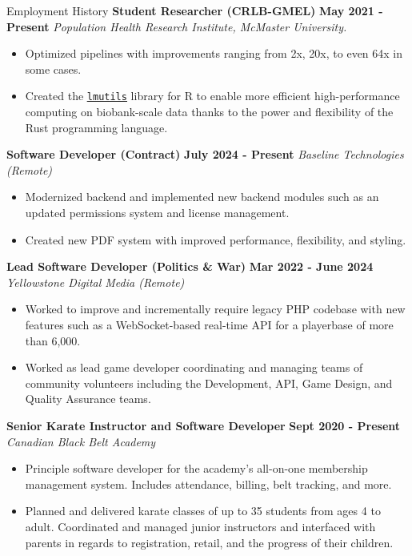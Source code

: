 \newcommand{\employer}[5]{%
	\entry*
	\textbf{#1} \hfill \textbf{#2 - #3}
	\newline
	\textit{#4}
	\begin{itemize}
		\setlength\parskip{-4pt}
		\vspace{-5pt}
		#5
	\end{itemize}
}

\newcommand{\link}[1]{\textcolor{MarkerColor}{\underline{#1}}}


\begin{rubric}{Employment History}
	\employer{Student Researcher (CRLB-GMEL)}{May 2021}{Present}{Population Health Research Institute, McMaster University.}{
		\item Optimized pipelines with improvements ranging from 2x, 20x, to even 64x in some cases.
		\item Created the \href{https://github.com/GMELab/lmutils.r}{\link{\texttt{lmutils}}} library for R to enable more efficient high-performance computing on biobank-scale data thanks to the power and flexibility of the Rust programming language.
	}
	\employer{Software Developer (Contract)}{July 2024}{Present}{Baseline Technologies (Remote)}{
		\item Modernized backend and implemented new backend modules such as an updated permissions system and license management.
		\item Created new PDF system with improved performance, flexibility, and styling.
	}
	\employer{Lead Software Developer (Politics \& War)}{Mar 2022}{June 2024}{Yellowstone Digital Media (Remote)}{
		\item Worked to improve and incrementally require legacy PHP codebase with new features such as a WebSocket-based real-time API for a playerbase of more than 6,000.
		\item Worked as lead game developer coordinating and managing teams of community volunteers including the Development, API, Game Design, and Quality Assurance teams.
	}
	\employer{Senior Karate Instructor and Software Developer}{Sept 2020}{Present}{Canadian Black Belt Academy}{
		\item Principle software developer for the academy's all-on-one membership management system. Includes attendance, billing, belt tracking, and more.
		\item Planned and delivered karate classes of up to 35 students from ages 4 to adult. Coordinated and managed junior instructors and interfaced with parents in regards to registration, retail, and the progress of their children.
	}
\end{rubric}
